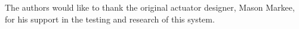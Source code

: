The authors would like to thank the original actuator designer, Mason Markee, for his support in the testing and research of this system.  